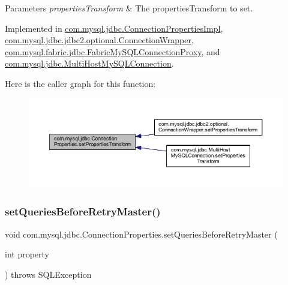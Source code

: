 \begin{DoxyParams}{Parameters}
{\em properties\+Transform} & The properties\+Transform to set. \\
\hline
\end{DoxyParams}


Implemented in \mbox{\hyperlink{classcom_1_1mysql_1_1jdbc_1_1_connection_properties_impl_a93084da20cac3293dc418ae1c9c8cb74}{com.\+mysql.\+jdbc.\+Connection\+Properties\+Impl}}, \mbox{\hyperlink{classcom_1_1mysql_1_1jdbc_1_1jdbc2_1_1optional_1_1_connection_wrapper_a6c9f8bd8652930ab22706c7c3cf23471}{com.\+mysql.\+jdbc.\+jdbc2.\+optional.\+Connection\+Wrapper}}, \mbox{\hyperlink{classcom_1_1mysql_1_1fabric_1_1jdbc_1_1_fabric_my_s_q_l_connection_proxy_a443dd11e427e039f4f7d6d25e7abffdc}{com.\+mysql.\+fabric.\+jdbc.\+Fabric\+My\+S\+Q\+L\+Connection\+Proxy}}, and \mbox{\hyperlink{classcom_1_1mysql_1_1jdbc_1_1_multi_host_my_s_q_l_connection_ab99171be57dd6ce8597774c664e46136}{com.\+mysql.\+jdbc.\+Multi\+Host\+My\+S\+Q\+L\+Connection}}.

Here is the caller graph for this function\+:\nopagebreak
\begin{figure}[H]
\begin{center}
\leavevmode
\includegraphics[width=350pt]{interfacecom_1_1mysql_1_1jdbc_1_1_connection_properties_a999fc9432437c9bf822f8e3ea6f03ce9_icgraph}
\end{center}
\end{figure}
\mbox{\label{interfacecom_1_1mysql_1_1jdbc_1_1_connection_properties_a957986bd12af4715d9b9bb097109a61b}} 
\subsubsection{\texorpdfstring{set\+Queries\+Before\+Retry\+Master()}{setQueriesBeforeRetryMaster()}}
{\footnotesize\ttfamily void com.\+mysql.\+jdbc.\+Connection\+Properties.\+set\+Queries\+Before\+Retry\+Master (\begin{DoxyParamCaption}\item[{int}]{property }\end{DoxyParamCaption}) throws S\+Q\+L\+Exception}


